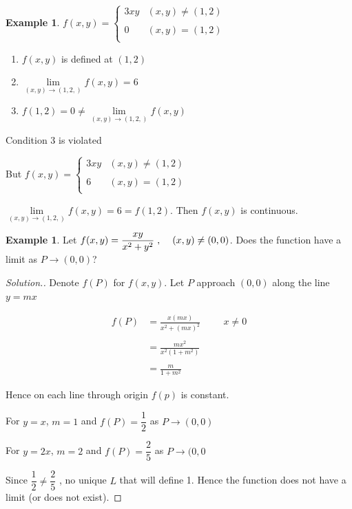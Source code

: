 \documentclass[11pt,a4paper]{article}
\theoremstyle{definition}
\newtheorem{exa}[thm]{Example}
\newenvironment{solution}
  {\renewcommand{\qedsymbol}{}\begin{proof}[\textit{Solution}.]}
  {\end{proof}}
\begin{document}
\begin{exa}


$f(x,y) = 
\begin{cases}
3xy & (x,y) \neq (1,2)\\\\
0 & (x,y) = (1,2)\\
\end{cases}
$


\begin{enumerate}
\item $f(x,y)$ is defined at $(1,2)$

\item $\displaystyle{\lim\limits_{(x,y)\rightarrow (1,2,)}f(x,y) = 6}$

\item $\displaystyle{ f(1,2) = 0\neq \lim\limits_{(x,y)\rightarrow (1,2,)}f(x,y)}$
\end{enumerate}

Condition 3 is violated


But
$f(x,y) = 
\begin{cases}
3xy & (x,y) \neq (1,2)\\\\
6 & (x,y) = (1,2)\\
\end{cases}
$


$\lim\limits_{(x,y)\rightarrow (1,2,)}f(x,y) = 6 = f(1,2)$. Then $f(x,y)$ is continuous.
\end{exa}


\begin{exa}


Let $\displaystyle{f(x,y) = \frac{xy}{x^2 + y^2}\hspace{0.1cm}, \hspace{0.4cm} (x,y) \neq (0,0)}$.
Does the function have a limit as $P \longrightarrow (0,0)$?
\end{exa}


\begin{solution}


Denote $f(P)$ for $f(x,y)$. Let $P$ approach $(0,0)$ along the line $y = mx$

\begin{align*}
f(P) & = \frac{x(mx)}{x^2 + (mx)^2}\hspace{1cm} x\neq 0\\\\
& = \frac{m x^2}{x^2(1 +m^2)}\\\\
& = \frac{m}{1 + m^2}
\end{align*}

Hence on each line through origin $f(p)$ is constant.


For $y = x$, $m = 1$ and $f(P) = \dfrac{1}{2}$ as $P \longrightarrow (0,0)$


For $y = 2x$, $m = 2$ and $f(P) = \dfrac{2}{5}$ as $P \longrightarrow (0,0$


Since $\dfrac{1}{2} \neq \dfrac{2}{5}$ , no unique $L$ that will define 1. Hence the function does not have a limit (or does not exist).
\end{solution}
\end{document}
